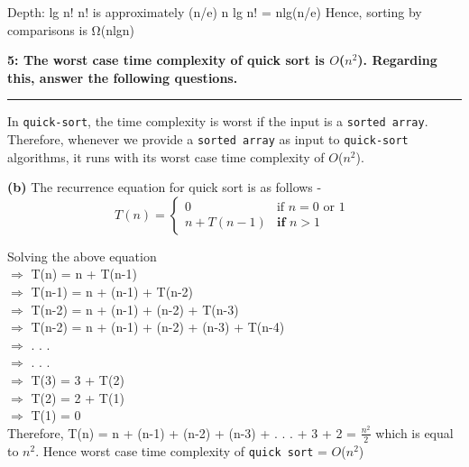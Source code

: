 \documentclass[11pt]{article}
\newcommand\question[3]{\vspace{.25in}\textbf{#1: #2}\vspace{.5em}\hrule\vspace{.10in}}
\renewcommand\part[1]{\vspace{.10in}\textbf{(#1)}}
\begin{document}
Depth: lg n!
n! is approximately (n/e) n
lg n! = nlg(n/e)
Hence, sorting by comparisons is Ω(nlgn)

\question{5} {The worst case time complexity of quick sort is $O$($n^2$). Regarding this, answer the following questions.}

\part{a} In \texttt{quick-sort}, the time complexity is worst if the input is a \texttt{sorted array}. Therefore, whenever we provide a \texttt{sorted array} as input to \texttt{quick-sort} algorithms,  it runs with its worst case  time complexity of $O$($n^2$).

\part{b} The recurrence equation for quick sort is as follows -
		\[ T(n) = \begin{cases}
				0 & \text{if $n = 0$ or 1 } \\
				n + T(n-1) & \textbf{if $n > 1$}
			\end{cases}
		\]

Solving the above equation  \\
\hspace{4.5cm}$\Rightarrow$ T(n) =  n + T(n-1) \\
\hspace{4.5cm}$\Rightarrow$ T(n-1) =  n + (n-1) + T(n-2) \\
\hspace{4.5cm}$\Rightarrow$ T(n-2) =  n + (n-1) + (n-2) + T(n-3) \\
\hspace{4.5cm}$\Rightarrow$ T(n-2) =  n + (n-1) + (n-2) + (n-3) + T(n-4) \\
\hspace{4.5cm}$\Rightarrow$ . . . \\
\hspace{4.5cm}$\Rightarrow$ . . . \\
\hspace{4.5cm}$\Rightarrow$ T(3) =  3 + T(2) \\
\hspace{4.5cm}$\Rightarrow$ T(2) =  2 + T(1) \\
\hspace{4.5cm}$\Rightarrow$ T(1) =  0 \\
Therefore, T(n) = n + (n-1) + (n-2) + (n-3) + . . . + 3 + 2 = $\frac{n^2}{2}$ which is equal to $n^2$. Hence worst case time complexity of \texttt{quick sort} = $O$($n^2$)
 
\end{document}
